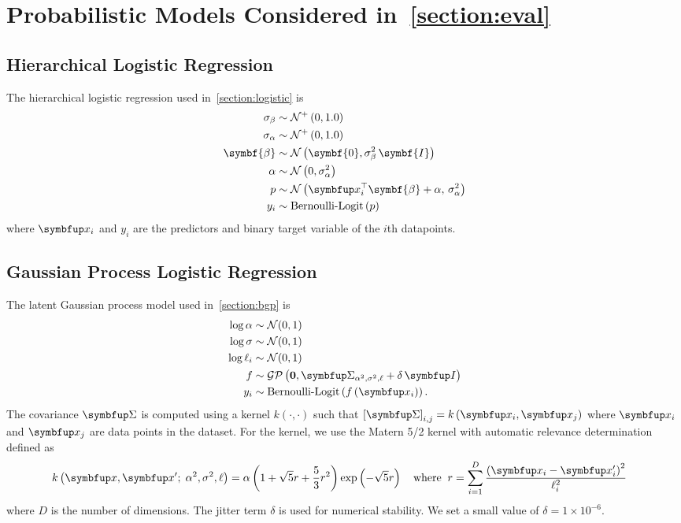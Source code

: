 
\section{Probabilistic Models Considered in~\cref{section:eval}}
\subsection{Hierarchical Logistic Regression}
The hierarchical logistic regression used in~\cref{section:logistic} is 
\begin{align*}
    \sigma_{\beta}  &\sim \mathcal{N}^+\left(0, 1.0\right) \\
    \sigma_{\alpha} &\sim \mathcal{N}^+\left(0, 1.0\right) \\
    \symbf{\beta} &\sim \mathcal{N}\left(\symbf{0}, \sigma_{\beta}^2\,\symbf{I}\right) \\
    \alpha        &\sim \mathcal{N}\left(0, \sigma_{\alpha}^2\right) \\
    p             &\sim \mathcal{N}\left(\vx_i^{\top}\symbf{\beta} + \alpha,\, \sigma_{\alpha}^2\right)\\
    y_i           &\sim \text{Bernoulli-Logit}\,(p)
\end{align*}
where \(\vx_i\) and \(y_i\) are the predictors and binary target variable of the \(i\)th datapoints.

\subsection{Gaussian Process Logistic Regression}
The latent Gaussian process model used in~\cref{section:bgp} is 
\begin{align*}
   \log \alpha &\sim \mathcal{N}(0, 1) \\
   \log \sigma &\sim \mathcal{N}(0, 1) \\
   \log \ell_i &\sim \mathcal{N}(0, 1) \\
   f &\sim \mathcal{GP}\left(\mathbf{0}, \mSigma_{\alpha^2, \sigma^2, \mathbf{\ell}} + \delta\,\mI \right) \\
   y_i &\sim \text{Bernoulli-Logit}\left(  f\left( \vx_i \right) \right).
\end{align*}
The covariance \(\mSigma\) is computed using a kernel \(k\left(\cdot, \cdot\right)\) such that \({[\mSigma]}_{i,j} = k\left( \vx_{i}, \vx_{j} \right) \) where \(\vx_i\) and \(\vx_j\) are data points in the dataset.
For the kernel, we use the Matern 5/2 kernel with automatic relevance determination~\citep{neal_bayesian_1996} defined as
\begin{align*}
  &k\left(\vx, \vx' ;\; \alpha^2, \sigma^2, \mathbf{\ell} \right) =
  \alpha \left( 1 + \sqrt{5} r + \frac{5}{3} r^2 \right) \exp\left( - \sqrt{5} r \right)  \quad
  \text{where}\;\; r = \sum^{D}_{i=1} \frac{ {\left(\vx_i - \vx'_i\right)}^2 }{\ell^2_i}
\end{align*}
where \(D\) is the number of dimensions.
The jitter term \(\delta\) is used for numerical stability.
We set a small value of \(\delta = 1\times10^{-6}\).

